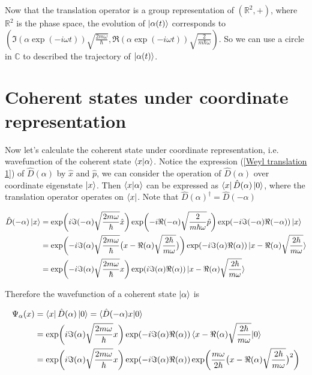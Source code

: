 \documentclass{article}
\begin{document}
        Now that the translation operator is a group representation of $(\mathbb{R}^2, +)$, where $\mathbb{R}^2$ is the phase space, the evolution of $\ket{\alpha(t)}$ corresponds to $(\Im(\alpha\exp(-i\omega t))\sqrt{\frac{2m\omega}{\hbar}}, \Re(\alpha\exp(-i\omega t))\sqrt{\frac{2}{m\hbar\omega}})$. So we can use a circle in $\mathbb{C}$ to described the trajectory of $\ket{\alpha(t)}$.

        

    \section{Coherent states under coordinate representation}
        
        Now let's calculate the coherent state under coordinate representation, i.e. wavefunction of the coherent state $\braket{x|\alpha}$. Notice the expression (\ref{Weyl translation 1}) of $\hat{D}(\alpha)$ by $\hat{x}$ and $\hat{p}$, we can consider the operation of $\hat{D}(\alpha)$ over coordinate eigenstate $\ket{x}$. Then  $\braket{x|\alpha}$ can be expressed as $\bra{x}\hat{D}(\alpha)\ket{{0}}$, where the translation operator operates on $\bra{x}$. Note that $\hat{D}(\alpha)^\dagger=\hat{D}(-\alpha)$

        \begin{equation}
            \begin{split}    
                \hat{D}(-\alpha)\ket{x} &= \exp\biggl(i\Im(-\alpha)\sqrt{\frac{2m\omega}{\hbar}}\hat{x}\biggr) \exp\biggl(-i\Re(-\alpha)\sqrt{\frac{2}{m\hbar\omega}}\hat{p}\biggr) \exp(-i \Im(-\alpha)\Re(-\alpha)) \ket{x} \\
                    &= \exp\biggl(-i\Im(\alpha)\sqrt{\frac{2m\omega}{\hbar}}\bigl(x-\Re(\alpha)\sqrt{\frac{2\hbar}{m\omega}}\bigr)\biggr) \exp(-i \Im(\alpha)\Re(\alpha)) \ket{x-\Re(\alpha)\sqrt{\frac{2\hbar}{m\omega}}}  \\
                    &= \exp\biggl(-i\Im(\alpha)\sqrt{\frac{2m\omega}{\hbar}}x\biggr) \exp(i\Im(\alpha)\Re(\alpha)) \ket{x-\Re(\alpha)\sqrt{\frac{2\hbar}{m\omega}}}
            \end{split}
        \end{equation}

        Therefore the wavefunction of a coherent state $\ket{\alpha}$ is 
        
        \begin{equation}
            \begin{split}
                \Psi_\alpha(x) &= \bra{x}\hat{D}(\alpha)\ket{0} = \braket{\hat{D}(-\alpha)x|0} \\
                    &= \exp\biggl(i\Im(\alpha)\sqrt{\frac{2m\omega}{\hbar}}x\biggr) \exp(-i\Im(\alpha)\Re(\alpha)) \braket{x-\Re(\alpha)\sqrt{\frac{2\hbar}{m\omega}} | 0} \\
                    &= \exp\biggl(i\Im(\alpha)\sqrt{\frac{2m\omega}{\hbar}}x\biggr) \exp(-i\Im(\alpha)\Re(\alpha)) \exp\biggl(\frac{m\omega}{2\hbar} \bigl(x-\Re(\alpha)\sqrt{\frac{2\hbar}{m\omega}}\bigr)^2 \biggr)
            \end{split}
        \end{equation}

        
        
\end{document}
